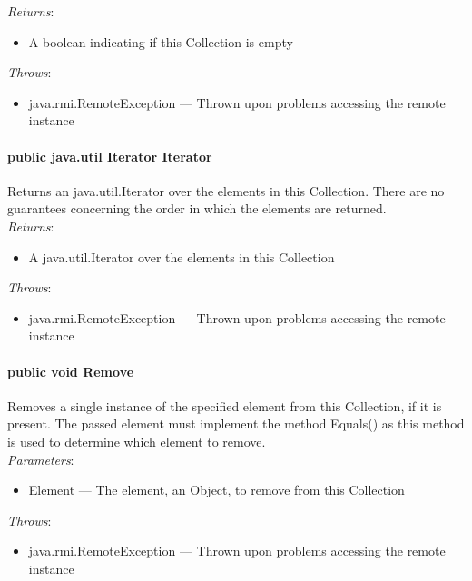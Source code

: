 \documentclass[$Date: 2003/06/26 19:29:31 $]{glabarticle}
\begin{document}
\textit{Returns}:
\begin{itemize}
\item[] A boolean indicating if this Collection is empty
\end{itemize}

 \textit{Throws}:
 \begin{itemize}
 \item[] java.rmi.RemoteException --- Thrown upon problems accessing the remote instance 
 \end{itemize}

\paragraph{public java.util Iterator Iterator}

Returns an java.util.Iterator over the elements in this Collection. There are no
guarantees concerning the order in which the elements are returned.\\

\textit{Returns}:
\begin{itemize}
\item[] A java.util.Iterator over the elements in this Collection
\end{itemize}

 \textit{Throws}:
 \begin{itemize}
 \item[] java.rmi.RemoteException --- Thrown upon problems accessing the remote instance 
 \end{itemize}

\paragraph{public void Remove}

Removes a single instance of the specified element from this
Collection, if it is present. The passed element must implement the
method Equals() as this method is used to determine which element to
remove.\\

\textit{Parameters}:
\begin{itemize}
\item[] Element --- The element, an Object, to remove from this Collection
\end{itemize}

 \textit{Throws}:
 \begin{itemize}
 \item[] java.rmi.RemoteException --- Thrown upon problems accessing the remote instance 
 \end{itemize}
\end{document}
